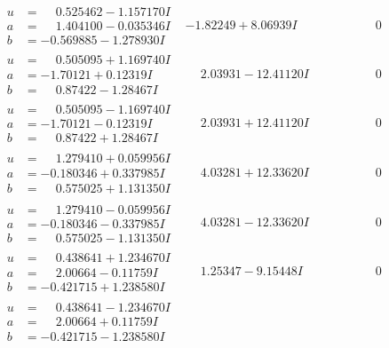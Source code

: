 \documentclass[1p]{elsarticle_modified}
\theoremstyle{definition}
\begin{document}
$$\begin{array}{c|c|c}
\begin{aligned}
u &= \phantom{-}0.525462 - 1.157170 I \\
a &= \phantom{-}1.404100 - 0.035346 I \\
b &= -0.569885 - 1.278930 I\end{aligned}
 & -1.82249 + 8.06939 I & \phantom{-0.000000 } 0 \\ \hline\begin{aligned}
u &= \phantom{-}0.505095 + 1.169740 I \\
a &= -1.70121 + 0.12319 I \\
b &= \phantom{-}0.87422 - 1.28467 I\end{aligned}
 & \phantom{-}2.03931 - 12.41120 I & \phantom{-0.000000 } 0 \\ \hline\begin{aligned}
u &= \phantom{-}0.505095 - 1.169740 I \\
a &= -1.70121 - 0.12319 I \\
b &= \phantom{-}0.87422 + 1.28467 I\end{aligned}
 & \phantom{-}2.03931 + 12.41120 I & \phantom{-0.000000 } 0 \\ \hline\begin{aligned}
u &= \phantom{-}1.279410 + 0.059956 I \\
a &= -0.180346 + 0.337985 I \\
b &= \phantom{-}0.575025 + 1.131350 I\end{aligned}
 & \phantom{-}4.03281 + 12.33620 I & \phantom{-0.000000 } 0 \\ \hline\begin{aligned}
u &= \phantom{-}1.279410 - 0.059956 I \\
a &= -0.180346 - 0.337985 I \\
b &= \phantom{-}0.575025 - 1.131350 I\end{aligned}
 & \phantom{-}4.03281 - 12.33620 I & \phantom{-0.000000 } 0 \\ \hline\begin{aligned}
u &= \phantom{-}0.438641 + 1.234670 I \\
a &= \phantom{-}2.00664 - 0.11759 I \\
b &= -0.421715 + 1.238580 I\end{aligned}
 & \phantom{-}1.25347 - 9.15448 I & \phantom{-0.000000 } 0 \\ \hline\begin{aligned}
u &= \phantom{-}0.438641 - 1.234670 I \\
a &= \phantom{-}2.00664 + 0.11759 I \\
b &= -0.421715 - 1.238580 I\end{aligned}

\end{array}$$
\end{document}
